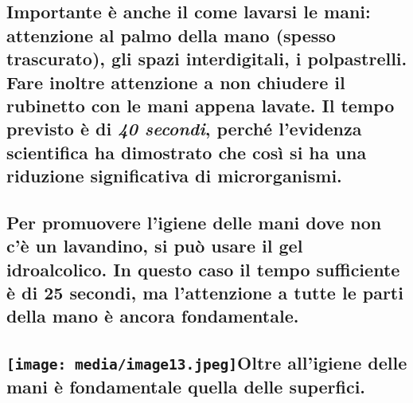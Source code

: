 \documentclass[]{article}
\begin{document}
\subsection{\texorpdfstring{Importante è anche il come lavarsi le mani:
attenzione al palmo della mano (spesso trascurato), gli spazi
interdigitali, i polpastrelli. Fare inoltre attenzione a non chiudere il
rubinetto con le mani appena lavate. Il tempo previsto è di \emph{40
secondi}, perché l'evidenza scientifica ha dimostrato che così si ha una
riduzione significativa di
microrganismi.}{Importante è anche il come lavarsi le mani: attenzione al palmo della mano (spesso trascurato), gli spazi interdigitali, i polpastrelli. Fare inoltre attenzione a non chiudere il rubinetto con le mani appena lavate. Il tempo previsto è di 40 secondi, perché l'evidenza scientifica ha dimostrato che così si ha una riduzione significativa di microrganismi.}}\label{importante-uxe8-anche-il-come-lavarsi-le-mani-attenzione-al-palmo-della-mano-spesso-trascurato-gli-spazi-interdigitali-i-polpastrelli.-fare-inoltre-attenzione-a-non-chiudere-il-rubinetto-con-le-mani-appena-lavate.-il-tempo-previsto-uxe8-di-40-secondi-perchuxe9-levidenza-scientifica-ha-dimostrato-che-cosuxec-si-ha-una-riduzione-significativa-di-microrganismi.}

\subsection{Per promuovere l'igiene delle mani dove non c'è un
lavandino, si può usare il gel idroalcolico. In questo caso il tempo
sufficiente è di 25 secondi, ma l'attenzione a tutte le parti della mano
è ancora
fondamentale.}\label{per-promuovere-ligiene-delle-mani-dove-non-cuxe8-un-lavandino-si-puuxf2-usare-il-gel-idroalcolico.-in-questo-caso-il-tempo-sufficiente-uxe8-di-25-secondi-ma-lattenzione-a-tutte-le-parti-della-mano-uxe8-ancora-fondamentale.}

\subsection{\texorpdfstring{\protect\texttt{[image: media/image13.jpeg]}Oltre
all'igiene delle mani è fondamentale quella delle superfici.
}{Oltre all'igiene delle mani è fondamentale quella delle superfici. }}\label{oltre-alligiene-delle-mani-uxe8-fondamentale-quella-delle-superfici.}
\end{document}
